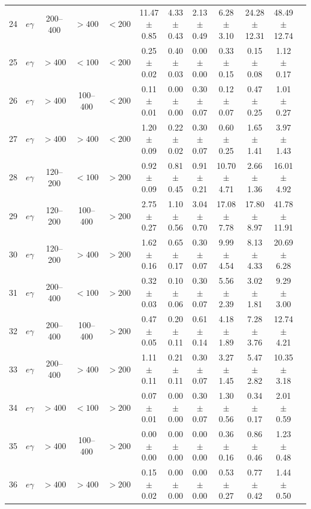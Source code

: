 \begin{table}[htbp]
{\begin{tabular}{|c|c|c|c|c|c|c|c|c|c|c|c|}
24 & $e\gamma$ & 200--400 & $>400$ & $<200$ & 11.47 $\pm$ 0.85 & 4.33 $\pm$ 0.43 & 2.13 $\pm$ 0.49 & 6.28 $\pm$ 3.10 & 24.28 $\pm$ 12.31 & 48.49 $\pm$ 12.74 &  \\
25 & $e\gamma$ & $>400$ & $<100$ & $<200$ & 0.25 $\pm$ 0.02 & 0.40 $\pm$ 0.03 & 0.00 $\pm$ 0.00 & 0.33 $\pm$ 0.15 & 0.15 $\pm$ 0.08 & 1.12 $\pm$ 0.17 &  \\
26 & $e\gamma$ & $>400$ & 100--400 & $<200$ & 0.11 $\pm$ 0.01 & 0.00 $\pm$ 0.00 & 0.30 $\pm$ 0.07 & 0.12 $\pm$ 0.07 & 0.47 $\pm$ 0.25 & 1.01 $\pm$ 0.27 &  \\
27 & $e\gamma$ & $>400$ & $>400$ & $<200$ & 1.20 $\pm$ 0.09 & 0.22 $\pm$ 0.02 & 0.30 $\pm$ 0.07 & 0.60 $\pm$ 0.25 & 1.65 $\pm$ 1.41 & 3.97 $\pm$ 1.43 &  \\
28 & $e\gamma$ & 120--200 & $<100$ & $>200$ & 0.92 $\pm$ 0.09 & 0.81 $\pm$ 0.45 & 0.91 $\pm$ 0.21 & 10.70 $\pm$ 4.71 & 2.66 $\pm$ 1.36 & 16.01 $\pm$ 4.92 &  \\
29 & $e\gamma$ & 120--200 & 100--400 & $>200$ & 2.75 $\pm$ 0.27 & 1.10 $\pm$ 0.56 & 3.04 $\pm$ 0.70 & 17.08 $\pm$ 7.78 & 17.80 $\pm$ 8.97 & 41.78 $\pm$ 11.91 &  \\
30 & $e\gamma$ & 120--200 & $>400$ & $>200$ & 1.62 $\pm$ 0.16 & 0.65 $\pm$ 0.17 & 0.30 $\pm$ 0.07 & 9.99 $\pm$ 4.54 & 8.13 $\pm$ 4.33 & 20.69 $\pm$ 6.28 &  \\
31 & $e\gamma$ & 200--400 & $<100$ & $>200$ & 0.32 $\pm$ 0.03 & 0.10 $\pm$ 0.06 & 0.30 $\pm$ 0.07 & 5.56 $\pm$ 2.39 & 3.02 $\pm$ 1.81 & 9.29 $\pm$ 3.00 &  \\
32 & $e\gamma$ & 200--400 & 100--400 & $>200$ & 0.47 $\pm$ 0.05 & 0.20 $\pm$ 0.11 & 0.61 $\pm$ 0.14 & 4.18 $\pm$ 1.89 & 7.28 $\pm$ 3.76 & 12.74 $\pm$ 4.21 &  \\
33 & $e\gamma$ & 200--400 & $>400$ & $>200$ & 1.11 $\pm$ 0.11 & 0.21 $\pm$ 0.11 & 0.30 $\pm$ 0.07 & 3.27 $\pm$ 1.45 & 5.47 $\pm$ 2.82 & 10.35 $\pm$ 3.18 &  \\
34 & $e\gamma$ & $>400$ & $<100$ & $>200$ & 0.07 $\pm$ 0.01 & 0.00 $\pm$ 0.00 & 0.30 $\pm$ 0.07 & 1.30 $\pm$ 0.56 & 0.34 $\pm$ 0.17 & 2.01 $\pm$ 0.59 &  \\
35 & $e\gamma$ & $>400$ & 100--400 & $>200$ & 0.00 $\pm$ 0.00 & 0.00 $\pm$ 0.00 & 0.00 $\pm$ 0.00 & 0.36 $\pm$ 0.16 & 0.86 $\pm$ 0.46 & 1.23 $\pm$ 0.48 &  \\
36 & $e\gamma$ & $>400$ & $>400$ & $>200$ & 0.15 $\pm$ 0.02 & 0.00 $\pm$ 0.00 & 0.00 $\pm$ 0.00 & 0.53 $\pm$ 0.27 & 0.77 $\pm$ 0.42 & 1.44 $\pm$ 0.50 &  \\
\hline
\end{tabular}}
\end{table}
